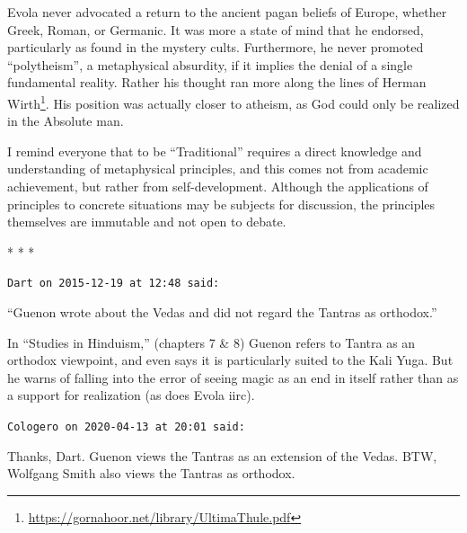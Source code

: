 Evola never advocated a return to the ancient pagan beliefs of Europe, whether Greek, Roman, or Germanic. It was more a state of mind that he endorsed, particularly as found in the mystery cults. Furthermore, he never promoted ``polytheism'', a metaphysical absurdity, if it implies the denial of a single fundamental reality. Rather his thought ran more along the lines of Herman Wirth\footnote{\url{https://gornahoor.net/library/UltimaThule.pdf}}. His position was actually closer to atheism, as God could only be realized in the Absolute man.

I remind everyone that to be ``Traditional'' requires a direct knowledge and understanding of metaphysical principles, and this comes not from academic achievement, but rather from self-development. Although the applications of principles to concrete situations may be subjects for discussion, the principles themselves are immutable and not open to debate.



\begin{center}* * *\end{center}

\begin{footnotesize}
\begin{sffamily}
\texttt{Dart on 2015-12-19 at 12:48 said:}

``Guenon wrote about the Vedas and did not regard the Tantras as orthodox.''

In ``Studies in Hinduism,'' (chapters 7 \& 8) Guenon refers to Tantra as an orthodox viewpoint, and even says it is particularly suited to the Kali Yuga. But he warns of falling into the error of seeing magic as an end in itself rather than as a support for realization (as does Evola iirc).

\hfill

\texttt{Cologero on 2020-04-13 at 20:01 said:}

Thanks, Dart. Guenon views the Tantras as an extension of the Vedas. BTW, Wolfgang Smith also views the Tantras as orthodox.

\end{sffamily}
\end{footnotesize}

